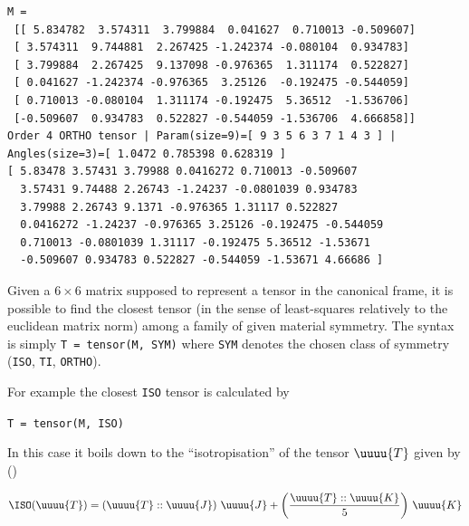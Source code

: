 \documentclass[
  letterpaper,
  DIV=11,
  numbers=noendperiod]{scrreprt}
\begin{document}
\begin{verbatim}
M =
 [[ 5.834782  3.574311  3.799884  0.041627  0.710013 -0.509607]
 [ 3.574311  9.744881  2.267425 -1.242374 -0.080104  0.934783]
 [ 3.799884  2.267425  9.137098 -0.976365  1.311174  0.522827]
 [ 0.041627 -1.242374 -0.976365  3.25126  -0.192475 -0.544059]
 [ 0.710013 -0.080104  1.311174 -0.192475  5.36512  -1.536706]
 [-0.509607  0.934783  0.522827 -0.544059 -1.536706  4.666858]]
Order 4 ORTHO tensor | Param(size=9)=[ 9 3 5 6 3 7 1 4 3 ] | Angles(size=3)=[ 1.0472 0.785398 0.628319 ]
[ 5.83478 3.57431 3.79988 0.0416272 0.710013 -0.509607 
  3.57431 9.74488 2.26743 -1.24237 -0.0801039 0.934783 
  3.79988 2.26743 9.1371 -0.976365 1.31117 0.522827 
  0.0416272 -1.24237 -0.976365 3.25126 -0.192475 -0.544059 
  0.710013 -0.0801039 1.31117 -0.192475 5.36512 -1.53671 
  -0.509607 0.934783 0.522827 -0.544059 -1.53671 4.66686 ]
\end{verbatim}

Given a \(6×6\) matrix supposed to represent a tensor in the canonical
frame, it is possible to find the closest tensor (in the sense of
least-squares relatively to the euclidean matrix norm) among a family of
given material symmetry. The syntax is simply
\texttt{T\ =\ tensor(M,\ SYM)} where \texttt{SYM} denotes the chosen
class of symmetry (\texttt{ISO}, \texttt{TI}, \texttt{ORTHO}).

For example the closest \texttt{ISO} tensor is calculated by

\texttt{T\ =\ tensor(M,\ ISO)}

In this case it boils down to the ``isotropisation'' of the tensor
\(\uuuu{T}\) given by ()

\[
\ISO(\uuuu{T})=\left(\uuuu{T}::\uuuu{J}\right)\,\uuuu{J}+\left(\frac{\uuuu{T}::\uuuu{K}}{5}\right)\,\uuuu{K}
\]
\end{document}
